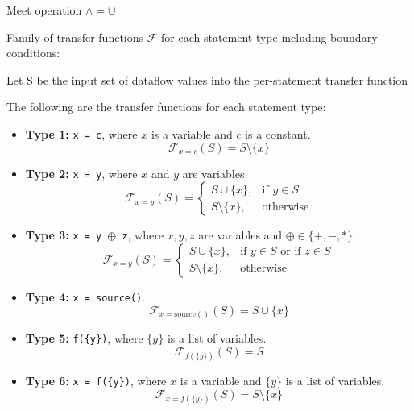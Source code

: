 \documentclass[12pt]{article}
\begin{document}
\begin{enumerate}
\begin{mdframed}
        Meet operation $\wedge = \cup $

        Family of transfer functions $\mathcal{F}$ for each statement type
        including boundary conditions:

        Let S be the input set of dataflow values into the per-statement transfer function

        The following are the transfer functions for each statement type:

        \begin{itemize}

            \item \textbf{Type 1:} \texttt{x = c}, where $x$ is a variable and $c$ is a constant.
            \[
                \mathcal{F}_{x = c}(S) = S \setminus \{x\}
            \]

            \item \textbf{Type 2:} \texttt{x = y}, where $x$ and $y$ are variables.
            \[
                \mathcal{F}_{x = y}(S) =
                \begin{cases}
                    S \cup \{x\}, & \text{if } y \in S \\
                    S \setminus \{x\}, & \text{otherwise}
                \end{cases}
            \]

            \item \textbf{Type 3:} \texttt{x = y $\oplus$ z}, where $x, y, z$ are variables and $\oplus \in \{+, -, *\}$.
            \[
                \mathcal{F}_{x = y}(S) =
                \begin{cases}
                    S \cup \{x\}, & \text{if } y \in S \text{ or } \text{if } z \in S \\
                    S \setminus \{x\}, & \text{otherwise}
                \end{cases}
            \]

            \item \textbf{Type 4:} \texttt{x = source()}.
            \[
                \mathcal{F}_{x = \text{source}()}(S) = S \cup \{x\}
            \]

            \item \textbf{Type 5:} \texttt{f(\{y\})}, where $\{y\}$ is a list of variables.
            \[
                \mathcal{F}_{f(\{y\})}(S) = S
            \]

            \item \textbf{Type 6:} \texttt{x = f(\{y\})}, where $x$ is a variable and $\{y\}$ is a list of variables.
            \[
                \mathcal{F}_{x = f(\{y\})}(S) = S \setminus \{x\}
            \]



\end{itemize}
\end{mdframed}
\end{enumerate}
\end{document}
